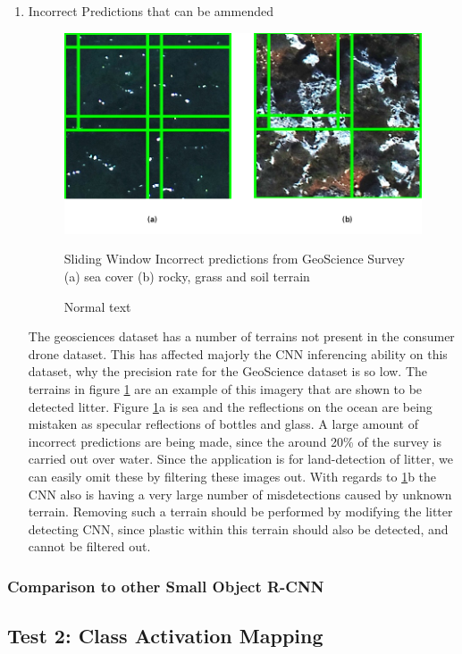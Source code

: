 \documentclass{article}
\begin{document}
\begin{enumerate}
\item Incorrect Predictions that can be ammended
\begin{figure}[H]
\centering
\label{fig:correctable2}
\includegraphics[scale=0.4]{images/test1-correctable2.png}
\caption{Sliding Window Incorrect predictions from GeoScience Survey (a) sea cover (b) rocky, grass and soil terrain}
\caption{Normal text }
\end{figure}

The geosciences dataset has a number of terrains not present in the consumer drone dataset. This has affected majorly the CNN inferencing ability on this dataset, why the precision rate for the GeoScience dataset is so low. The terrains in figure \ref{fig:correctable2} are an example of this imagery that are shown to be detected litter. Figure \ref{fig:correctable2}a is sea and the reflections on the ocean are being mistaken as specular reflections of bottles and glass. A large amount of incorrect predictions are being made, since the around 20\% of the survey is carried out over water. Since the application is for land-detection of litter, we can easily omit these by filtering these images out. With regards to \ref{fig:correctable2}b the CNN also is having a very large number of misdetections caused by unknown terrain. Removing such a terrain should be performed by modifying the litter detecting CNN, since plastic within this terrain should also be detected, and cannot be filtered out.

\end{enumerate}

\subsubsection{Comparison to other Small Object R-CNN}


\subsection{Test 2: Class Activation Mapping}
\end{document}

